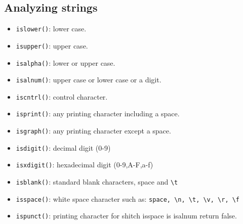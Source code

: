 \subsection{Analyzing strings}
\begin{itemize}
    \item \texttt{islower()}: lower case.
    \item \texttt{isupper()}: upper case.
    \item \texttt{isalpha()}: lower or upper case.
    \item \texttt{isalnum()}: upper case or lower case or a digit. 
    \item \texttt{iscntrl()}: control character. 
    \item \texttt{isprint()}: any printing character including a space. 
    \item \texttt{isgraph()}: any printing character except a space.
    \item \texttt{isdigit()}: decimal digit (0-9)
    \item \texttt{isxdigit()}: hexadecimal digit (0-9,A-F,a-f)
    \item \texttt{isblank()}: standard blank characters, space and \verb|\t|
    \item \texttt{isspace()}: white space character such as: \verb|space, \n, \t, \v, \r, \f|
    \item \texttt{ispunct()}: printing character for shitch isspace is isalnum return false. 
\end{itemize}


